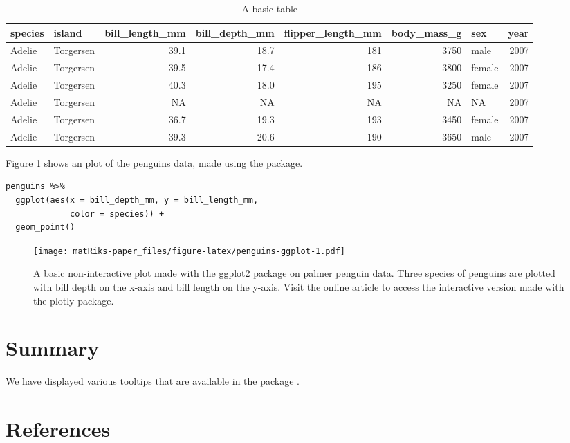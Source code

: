 \begin{table}

\caption{\label{tab:penguins-tab-static}A basic table}
\centering
\fontsize{7}{9}\selectfont
\begin{tabular}[t]{l|l|r|r|r|r|l|r}
\hline
species & island & bill\_length\_mm & bill\_depth\_mm & flipper\_length\_mm & body\_mass\_g & sex & year\\
\hline
Adelie & Torgersen & 39.1 & 18.7 & 181 & 3750 & male & 2007\\
\hline
Adelie & Torgersen & 39.5 & 17.4 & 186 & 3800 & female & 2007\\
\hline
Adelie & Torgersen & 40.3 & 18.0 & 195 & 3250 & female & 2007\\
\hline
Adelie & Torgersen & NA & NA & NA & NA & NA & 2007\\
\hline
Adelie & Torgersen & 36.7 & 19.3 & 193 & 3450 & female & 2007\\
\hline
Adelie & Torgersen & 39.3 & 20.6 & 190 & 3650 & male & 2007\\
\hline
\end{tabular}
\end{table}

Figure \ref{fig:penguins-ggplot} shows an plot of the penguins data, made using the  package.

\begin{verbatim}
penguins %>% 
  ggplot(aes(x = bill_depth_mm, y = bill_length_mm, 
             color = species)) + 
  geom_point()
\end{verbatim}

\begin{figure}
\centering
\texttt{[image: matRiks-paper\_files/figure-latex/penguins-ggplot-1.pdf]}
\caption{\label{fig:penguins-ggplot}A basic non-interactive plot made with the ggplot2 package on palmer penguin data. Three species of penguins are plotted with bill depth on the x-axis and bill length on the y-axis. Visit the online article to access the interactive version made with the plotly package.}
\end{figure}

\hypertarget{summary-1}{%
\section{Summary}\label{summary-1}}

We have displayed various tooltips that are available in the package .

\hypertarget{references}{%
\section*{References}\label{references}}

